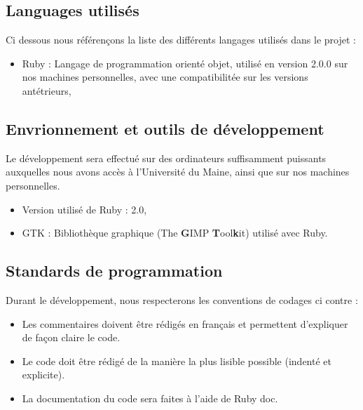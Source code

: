 \documentclass[11pt]{article}
\begin{document}
\subsection{Languages utilisés}

Ci dessous nous référençons la liste des différents langages utilisés dans le projet : 

\begin{itemize}
	\item Ruby : Langage de programmation orienté objet, utilisé en version 2.0.0 sur nos machines personnelles, avec une compatibilitée sur les versions antétrieurs,
\end{itemize}

\subsection{Envrionnement et outils de développement}

Le développement sera effectué sur des ordinateurs suffisamment puissants auxquelles nous avons accès à l'Université du Maine, ainsi que sur nos machines personnelles.

\begin{itemize}
		\item Version utilisé de Ruby : 2.0,
		\item GTK : Bibliothèque graphique (The \textbf{G}IMP \textbf{T}ool\textbf{k}it) utilisé avec Ruby.
\end{itemize}

\subsection{Standards de programmation}

Durant le développement, nous respecterons les conventions de codages ci contre : 

\begin{itemize}
	\item Les commentaires doivent être rédigés en français et permettent d'expliquer de façon claire le code.
    \item Le code doit être rédigé de la manière la plus lisible possible (indenté et explicite).
	\item La documentation du code sera faites à l'aide de Ruby doc.
\end{itemize}
\end{document}
